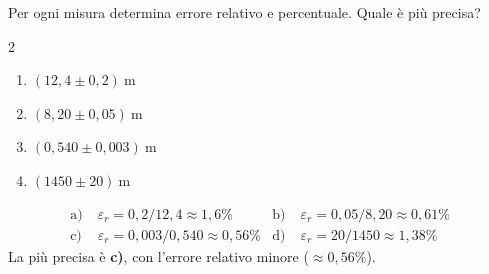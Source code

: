 \begin{question}[ID=4.1, subtitle={Errore relativo e percentuale — confronto precisione}, tags={errori, relativo e percentuale}, difficulty=media]
Per ogni misura determina errore relativo e percentuale. Quale è più precisa?
\begin{center}\begin{minipage}{0.92\linewidth}
\begin{multicols}{2}
\begin{enumerate}[label=\alph*),leftmargin=1.8cm]
\item $(12{,}4 \pm 0{,}2)\ \text{m}$
\item $(8{,}20 \pm 0{,}05)\ \text{m}$
\item $(0{,}540 \pm 0{,}003)\ \text{m}$
\item $(1450 \pm 20)\ \text{m}$
\end{enumerate}
\end{multicols}
\end{minipage}\end{center}
\begin{solution}
\begin{align*}
\text{a)}\; &\varepsilon_r = 0{,}2/12{,}4 \approx 1{,}6\% &
\text{b)}\; &\varepsilon_r = 0{,}05/8{,}20 \approx 0{,}61\% \\
\text{c)}\; &\varepsilon_r = 0{,}003/0{,}540 \approx 0{,}56\% &
\text{d)}\; &\varepsilon_r = 20/1450 \approx 1{,}38\%
\end{align*}
La più precisa è \textbf{c)}, con l'errore relativo minore ($\approx 0{,}56\%$).
\end{solution}
\end{question}

